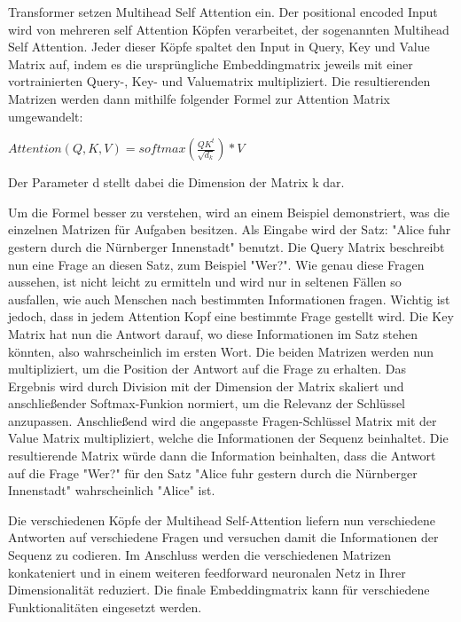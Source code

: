 Transformer setzen Multihead Self Attention ein. 
Der positional encoded Input wird von mehreren self Attention Köpfen verarbeitet, der sogenannten Multihead Self Attention. 
Jeder dieser Köpfe spaltet den Input in Query, Key und Value Matrix auf, indem es die ursprüngliche Embeddingmatrix jeweils mit einer vortrainierten Query-, Key- und Valuematrix multipliziert.
Die resultierenden Matrizen werden dann mithilfe folgender Formel zur Attention Matrix umgewandelt:

$Attention(Q,K,V)=softmax(\frac{QK^t}{\sqrt{d_k}})*V$

Der Parameter d stellt dabei die Dimension der Matrix k dar.

Um die Formel besser zu verstehen, wird an einem Beispiel demonstriert, was die einzelnen Matrizen für Aufgaben besitzen.
Als Eingabe wird der Satz: "Alice fuhr gestern durch die Nürnberger Innenstadt" benutzt.
Die Query Matrix beschreibt nun eine Frage an diesen Satz, zum Beispiel "Wer?".
Wie genau diese Fragen aussehen, ist nicht leicht zu ermitteln und wird nur in seltenen Fällen so ausfallen, wie auch Menschen nach bestimmten Informationen fragen.
Wichtig ist jedoch, dass in jedem Attention Kopf eine bestimmte Frage gestellt wird.
Die Key Matrix hat nun die Antwort darauf, wo diese Informationen im Satz stehen könnten, also wahrscheinlich im ersten Wort. 
Die beiden Matrizen werden nun multipliziert, um die Position der Antwort auf die Frage zu erhalten. 
Das Ergebnis wird durch Division mit der Dimension der Matrix skaliert und anschließender Softmax-Funkion normiert, um die Relevanz der Schlüssel anzupassen.
Anschließend wird die angepasste Fragen-Schlüssel Matrix mit der Value Matrix multipliziert, welche die Informationen der Sequenz beinhaltet. 
Die resultierende Matrix würde dann die Information beinhalten, dass die Antwort auf die Frage "Wer?" für den Satz "Alice fuhr gestern durch die Nürnberger Innenstadt" wahrscheinlich "Alice" ist.

Die verschiedenen Köpfe der Multihead Self-Attention liefern nun verschiedene Antworten auf verschiedene Fragen und versuchen damit die Informationen der Sequenz zu codieren.
Im Anschluss werden die verschiedenen Matrizen konkateniert und in einem weiteren feedforward neuronalen Netz in Ihrer Dimensionalität reduziert.
Die finale Embeddingmatrix kann für verschiedene Funktionalitäten eingesetzt werden.

